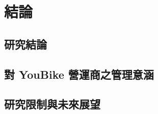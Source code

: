 
\chapter{結論}\label{chap:Conclusion}

\section{研究結論}

\section{對 YouBike 營運商之管理意涵}

\section{研究限制與未來展望}
